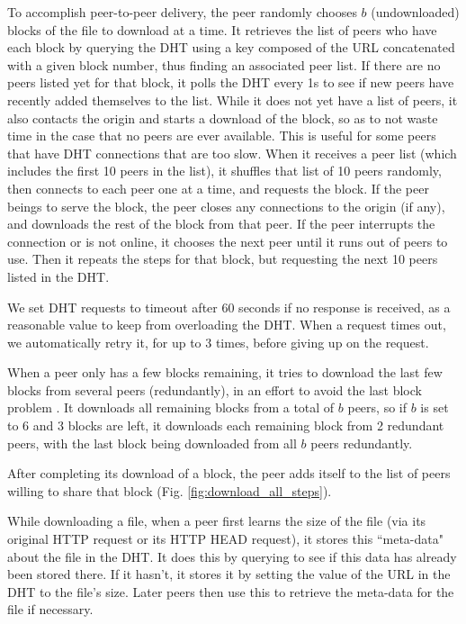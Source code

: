 To accomplish peer-to-peer delivery, the peer randomly chooses $b$ (undownloaded) blocks of the file to download at a time.  
It retrieves the list of peers who have each block by querying the DHT using a key composed of
the URL concatenated with a given block number, thus finding an associated peer list.  
If there are no peers listed yet for that block, it polls the DHT every 1s to see if new peers have recently added themselves to the list.
While it does not yet have a list of peers, it also contacts the origin and starts a download of the block, so as to 
not waste time in the case that no peers are ever available.  This is useful for some peers that have DHT connections that are too slow.
When it receives a peer list (which includes the first 10 peers in the list), it shuffles that list of 10 peers randomly, then connects to each peer one at a time, and requests the block.  
If the peer beings to serve the block, the peer closes any connections to the origin (if any), and downloads the rest of the block from that peer.  If the peer interrupts the connection
or is not online, it chooses the next peer until it runs out of peers to use.  Then it repeats the steps for that block, but requesting the next 10 peers listed in the DHT.

We set DHT requests to timeout after 60 seconds if no response is received, as a reasonable value to keep from 
overloading the DHT.  When a request times out, we automatically retry it, for up to 3 times, before giving up on the request.

When a peer only has a few blocks remaining, it tries to download the last few blocks from several peers (redundantly), in an effort to avoid the last block problem \cite{last_block}.  
It downloads all remaining blocks from a total of $b$ peers, so if $b$ is set to 6 and 3 blocks are left, it downloads each remaining block from 2 redundant peers, with the
last block being downloaded from all $b$ peers redundantly.

After completing its download of a block, the peer adds itself to the list of peers willing to share that block (Fig. \ref{fig:download_all_steps}). 

While downloading a file, when a peer first learns the size of the file (via its original HTTP request or its HTTP HEAD request), it stores this ``meta-data" about the file
in the DHT.  It does this by querying to see if this data has already been stored there.  If it hasn't, it stores it by setting the value of the URL in the DHT to the file's size. 
Later peers then use this to retrieve the meta-data for the file if necessary.

